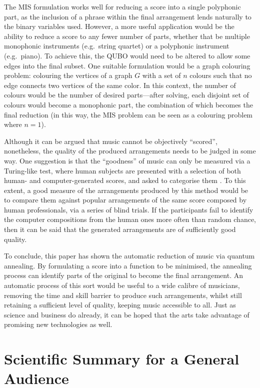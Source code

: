 \documentclass[aps,pra,10pt,twocolumn]{revtex4-2}
\begin{document}
The MIS formulation works well for reducing a score into a single polyphonic part, as the inclusion of a phrase within the final arrangement lends naturally to the binary variables used. However, a more useful application would be the ability to reduce a score to any fewer number of parts, whether that be multiple monophonic instruments (e.g.\ string quartet) or a polyphonic instrument (e.g.\ piano). To achieve this, the QUBO would need to be altered to allow some edges into the final subset. One suitable formulation would be a graph colouring problem: colouring the vertices of a graph $G$ with a set of $n$ colours such that no edge connects two vertices of the same color. In this context, the number of colours would be the number of desired parts—after solving, each disjoint set of colours would become a monophonic part, the combination of which becomes the final reduction (in this way, the MIS problem can be seen as a colouring problem where $n=1$).

Although it can be argued that music cannot be objectively ``scored'', nonetheless, the quality of the produced arrangements needs to be judged in some way. One suggestion is that the ``goodness'' of music can only be measured via a Turing-like test, where human subjects are presented with a selection of both human- and computer-generated scores, and asked to categorise them \cite{pearce_towards_2001}. To this extent, a good measure of the arrangements produced by this method would be to compare them against popular arrangements of the same score composed by human professionals, via a series of blind trials. If the participants fail to identify the computer compositions from the human ones more often than random chance, then it can be said that the generated arrangements are of sufficiently good quality.

To conclude, this paper has shown the automatic reduction of music via quantum annealing. By formulating a score into a function to be minimised, the annealing process can identify parts of the original to become the final arrangement. An automatic process of this sort would be useful to a wide calibre of musicians, removing the time and skill barrier to produce such arrangements, whilst still retaining a sufficient level of quality, keeping music accessible to all. Just as science and business do already, it can be hoped that the arts take advantage of promising new technologies as well.

\nocite{*}


\clearpage

\onecolumngrid %

\section*{Scientific Summary for a General Audience}

\lipsum[1]
\end{document}
